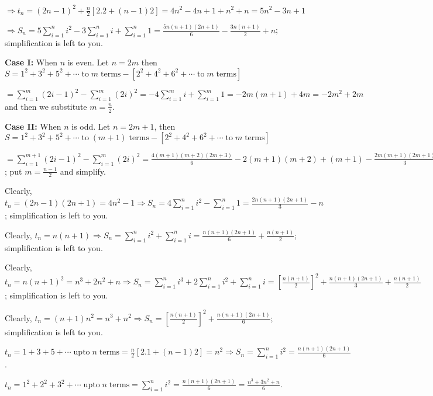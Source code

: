   $\Rightarrow t_n = (2n - 1)^2 + \frac{n}{2}[2.2 + (n - 1)2] = 4n^2 - 4n + 1 + n^2 + n = 5n^2 - 3n + 1$

  $\Rightarrow S_n = 5\sum_{i=1}^ni^2 - 3\sum_{i=1}^ni + \sum_{i=1}^n1 = \frac{5n(n + 1)(2n + 1)}{6} -
  \frac{3n(n + 1)}{2} + n$; simplification is left to you.
\item {\bf Case I:} When $n$ is even. Let $n = 2m$ then $S = 1^2 + 3^2 + 5^2 +
  \cdots\;\mathrm{to}\;m\;\mathrm{terms} - [2^2 + 4^2 + 6^2 + \cdots\;\mathrm{to}\;m\;\mathrm{terms}]$

  $= \sum_{i=1}^m(2i - 1)^2 - \sum_{i=1}^m(2i)^2 = -4\sum_{i=1}^mi + \sum_{i=1}^m1 = -2m(m + 1) + 4m = -2m^2
  + 2m$ and then we substitute $m = \frac{n}{2}$.

  {\bf Case II:} When $n$ is odd. Let $n = 2m + 1$, then $S = 1^2 + 3^2 + 5^2 +
  \cdots\;\mathrm{to}\;(m + 1)\;\mathrm{terms} - [2^2 + 4^2 + 6^2 + \cdots\;\mathrm{to}\;m\;\mathrm{terms}]$

  $= \displaystyle\sum_{i=1}^{m + 1}(2i - 1)^2 - \sum_{i=1}^m(2i)^2 = \frac{4(m + 1)(m + 2)(2m + 3)}{6} -
  2(m + 1)(m + 2) + (m + 1) - \frac{2m(m + 1)(2m + 1)}{3}$; put $m = \frac{n - 1}{2}$ and simplify.
\item Clearly, $t_n = (2n - 1)(2n + 1) = 4n^2 - 1\Rightarrow S_n = \displaystyle4\sum_{i=1}^ni^2 -
  \sum_{i=1}^n1 = \frac{2n(n + 1)(2n + 1)}{3} - n$; simplification is left to you.
\item Clearly, $t_n = n(n + 1) \Rightarrow\displaystyle S_n = \sum_{i=1}^ni^2 + \sum_{i=1}^ni = \frac{n(n +
  1)(2n + 1)}{6} + \frac{n(n + 1)}{2}$; simplification is left to you.
\item Clearly, $t_n = n(n + 1)^2 = n^3 + 2n^2 + n \Rightarrow \displaystyle S_n = \sum_{i=1}^ni^3 +
  2\sum_{i=1}^ni^2 + \sum_{i=1}^ni = \left[\frac{n(n + 1)}{2}\right]^2 + \frac{n(n + 1)(2n + 1)}{3} +
  \frac{n(n + 1)}{2}$; simplification is left to you.
\item Clearly, $t_n = (n + 1)n^2 = n^3 + n^2 \Rightarrow \displaystyle S_n = \left[\frac{n(n +
    1)}{2}\right]^2 + \frac{n(n + 1)(2n + 1)}{6}$;  simplification is left to you.
\item $t_n = 1 + 3 + 5 + \cdots\;\mathrm{up to}\;n\;\mathrm{terms} = \frac{n}{2}[2.1 + (n - 1)2] = n^2
  \Rightarrow \displaystyle S_n = \sum_{i=1}^ni^2 = \frac{n(n + 1)(2n + 1)}{6}$.
\item $t_n = 1^2 + 2^2 + 3^2 + \cdots\;\mathrm{up to}\;n\;\mathrm{terms} = \displaystyle\sum_{i=1}^ni^2 =
  \frac{n(n + 1)(2n + 1)}{6} = \frac{n^3 + 3n^2 + n}{6}$.

